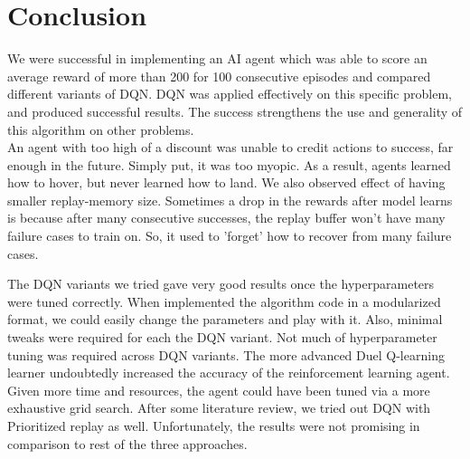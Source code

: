 \section{Conclusion}
\label{sec:conclusion}

We were successful in implementing an AI agent which was able to score an average reward of more than 200 for 100 consecutive episodes and compared different variants of DQN. DQN was applied effectively on this specific problem, and produced successful results. The success strengthens the use and generality of this algorithm on other problems. \\
An agent with too high of a discount was unable to credit actions to success, far enough in the future. Simply put, it was too myopic. As a result, agents learned how to hover, but never learned how to land. We also observed effect of having smaller replay-memory size. Sometimes a drop in the rewards after model learns is because after many consecutive successes, the replay buffer won't have many failure cases to train on. So, it used to 'forget' how to recover from many failure cases.

The DQN variants we tried gave very good results once the hyperparameters were tuned correctly. When implemented the algorithm code in a modularized format, we could easily change the parameters and play with it. Also, minimal tweaks were required for each the DQN variant. Not much of hyperparameter tuning was required across DQN variants. The more advanced Duel Q-learning learner undoubtedly increased the accuracy of the reinforcement learning agent. Given more time and resources, the agent could have been tuned via a more exhaustive grid search. After some literature review, we tried out DQN with Prioritized replay as well. Unfortunately, the results were not promising in comparison to rest of the three approaches. 
